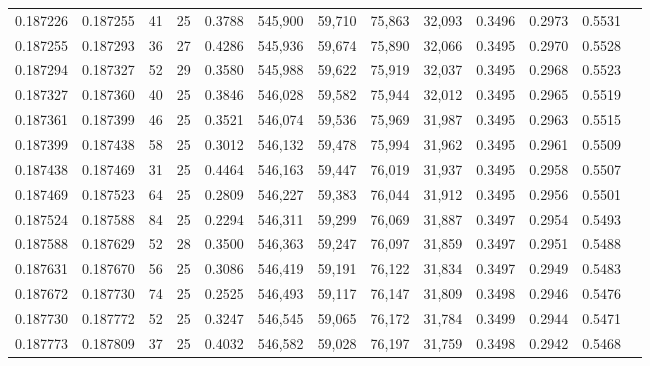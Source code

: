 \begin{tabular}{rrrrrrrrrrrrr}
0.187226 & 0.187255 &    41 &  25 &                                     0.3788 & 545,900 &  59,710 &  75,863 &  32,093 & 0.3496 & 0.2973 & 0.5531 \\
0.187255 & 0.187293 &    36 &  27 &                                     0.4286 & 545,936 &  59,674 &  75,890 &  32,066 & 0.3495 & 0.2970 & 0.5528 \\
0.187294 & 0.187327 &    52 &  29 &                                     0.3580 & 545,988 &  59,622 &  75,919 &  32,037 & 0.3495 & 0.2968 & 0.5523 \\
0.187327 & 0.187360 &    40 &  25 &                                     0.3846 & 546,028 &  59,582 &  75,944 &  32,012 & 0.3495 & 0.2965 & 0.5519 \\
0.187361 & 0.187399 &    46 &  25 &                                     0.3521 & 546,074 &  59,536 &  75,969 &  31,987 & 0.3495 & 0.2963 & 0.5515 \\
0.187399 & 0.187438 &    58 &  25 &                                     0.3012 & 546,132 &  59,478 &  75,994 &  31,962 & 0.3495 & 0.2961 & 0.5509 \\
0.187438 & 0.187469 &    31 &  25 &                                     0.4464 & 546,163 &  59,447 &  76,019 &  31,937 & 0.3495 & 0.2958 & 0.5507 \\
0.187469 & 0.187523 &    64 &  25 &                                     0.2809 & 546,227 &  59,383 &  76,044 &  31,912 & 0.3495 & 0.2956 & 0.5501 \\
0.187524 & 0.187588 &    84 &  25 &                                     0.2294 & 546,311 &  59,299 &  76,069 &  31,887 & 0.3497 & 0.2954 & 0.5493 \\
0.187588 & 0.187629 &    52 &  28 &                                     0.3500 & 546,363 &  59,247 &  76,097 &  31,859 & 0.3497 & 0.2951 & 0.5488 \\
0.187631 & 0.187670 &    56 &  25 &                                     0.3086 & 546,419 &  59,191 &  76,122 &  31,834 & 0.3497 & 0.2949 & 0.5483 \\
0.187672 & 0.187730 &    74 &  25 &                                     0.2525 & 546,493 &  59,117 &  76,147 &  31,809 & 0.3498 & 0.2946 & 0.5476 \\
0.187730 & 0.187772 &    52 &  25 &                                     0.3247 & 546,545 &  59,065 &  76,172 &  31,784 & 0.3499 & 0.2944 & 0.5471 \\
0.187773 & 0.187809 &    37 &  25 &                                     0.4032 & 546,582 &  59,028 &  76,197 &  31,759 & 0.3498 & 0.2942 & 0.5468 \\

\end{tabular}
